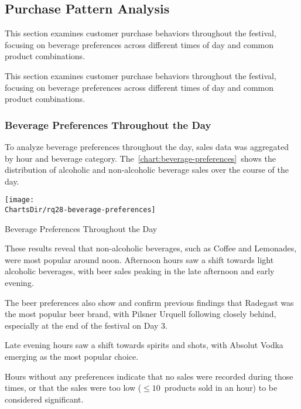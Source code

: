 \subsection{Purchase Pattern Analysis}
\label{subsec:analysis-customer-purchase-pattern}

This section examines customer purchase behaviors throughout the festival, focusing on beverage preferences across different times of day and common product combinations.

This section examines customer purchase behaviors throughout the festival, focusing on beverage preferences across different times of day and common product combinations.


\subsubsection{Beverage Preferences Throughout the Day}
\label{subsubsec:analysis-beverage-preferences}


To analyze beverage preferences throughout the day, sales data was aggregated by hour and beverage category.
The~\autoref{chart:beverage-preferences}~shows the distribution of alcoholic and non-alcoholic beverage sales over the course of the day.

\begin{chart}[H]
	\centering
	\texttt{[image: \\ChartsDir/rq28-beverage-preferences]}
	\caption{ Beverage Preferences Throughout the Day}
	\label{chart:beverage-preferences}
	\source
\end{chart}

These results reveal that non-alcoholic beverages, such as Coffee and Lemonades, were most popular around noon.
Afternoon hours saw a shift towards light alcoholic beverages, with beer sales peaking in the late afternoon and early evening.

The beer preferences also show and confirm previous findings that Radegast was the most popular beer brand, with Pilsner Urquell following closely behind, especially at the end of the festival on Day 3.

Late evening hours saw a shift towards spirits and shots, with Absolut Vodka emerging as the most popular choice.

Hours without any preferences indicate that no sales were recorded during those times, or that the sales were too low (\(\leq 10\)~products sold in an hour) to be considered significant.

